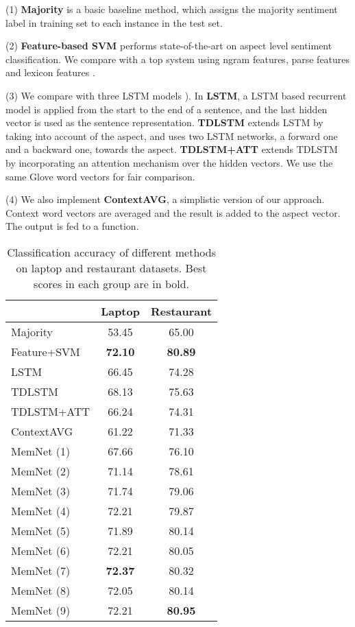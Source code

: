 \documentclass[11pt,letterpaper]{article}
\begin{document}
(1) \textbf{Majority} is a basic baseline method, which assigns the majority sentiment label in training set to each instance in the test set.

(2) \textbf{Feature-based SVM} performs state-of-the-art on aspect level sentiment classification.
We compare with a top system using ngram features, parse features and lexicon features \cite{Kiritchenko2014-SemEval}. 


(3) We compare with three LSTM models \cite{Tang2015arxiv}). In \textbf{LSTM}, a LSTM based recurrent model is applied from the start to the end of a sentence, and the last hidden vector is used as the sentence representation. \textbf{TDLSTM} extends LSTM by taking into account of the aspect, and uses two LSTM networks, a forward one and a backward one, towards the aspect.
\textbf{TDLSTM+ATT} extends TDLSTM by incorporating an attention mechanism \cite{Bahdanau2015} over the  hidden vectors.
We use the same Glove word vectors for fair comparison. 


(4) We also implement \textbf{ContextAVG}, a simplistic version of our approach. Context word vectors are averaged and the result is added to the aspect vector. 
The output is fed to a  function.


\begin{table}[h]
	\centering
	\begin{tabular}{l|c|c}
		\hline
		& {Laptop} & {Restaurant} \\
		\hline
		Majority 				& 53.45	& 65.00 \\
		Feature+SVM				& \textbf{72.10}	& \textbf{80.89} \\
		LSTM					& 66.45 & 74.28 \\
		TDLSTM					& 68.13 & 75.63 \\
		TDLSTM+ATT				& 66.24 & 74.31 \\
		ContextAVG				& 61.22	& 71.33	\\
		\hline
		MemNet (1)				& 67.66 & 76.10 \\
		MemNet (2)				& 71.14 & 78.61 \\
		MemNet (3)				& 71.74 & 79.06 \\
		MemNet (4)				& 72.21 & 79.87 \\
		MemNet (5)				& 71.89 & 80.14 \\
		MemNet (6)				& 72.21 & 80.05 \\
		MemNet (7)				& \textbf{72.37} & 80.32 \\
		MemNet (8)				& 72.05 & 80.14 \\
		MemNet (9)				& 72.21 & \textbf{80.95} \\
		\hline
	\end{tabular}	
	\caption{Classification accuracy of different methods on laptop and restaurant datasets. Best scores in each group are in bold.}
	\label{table:experiment-baseline}
\end{table}
\end{document}
